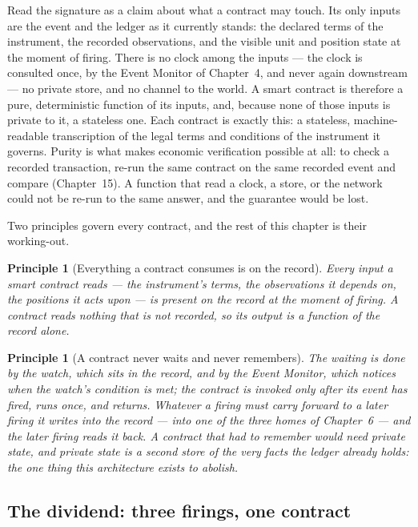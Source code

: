 \documentclass[11pt,a4paper]{article}
\newtheorem{principle}[definition]{Principle}
\begin{document}
Read the signature as a claim about what a contract may touch. Its only inputs
are the event and the ledger as it currently stands: the declared terms of the
instrument, the recorded observations, and the visible unit and position state
at the moment of firing. There is no clock among the inputs --- the clock is
consulted once, by the Event Monitor of Chapter~4, and never again downstream
--- no private store, and no channel to the world. A smart contract is
therefore a pure, deterministic function of its inputs, and, because none of
those inputs is private to it, a stateless one. Each contract is exactly this: a
stateless, machine-readable transcription of the legal terms and conditions of
the instrument it governs. Purity is what makes economic verification possible
at all: to check a recorded transaction, re-run the same contract on the same
recorded event and compare (Chapter~15). A function that read a clock, a store,
or the network could not be re-run to the same answer, and the guarantee would
be lost.

Two principles govern every contract, and the rest of this chapter is their
working-out.

\begin{principle}[Everything a contract consumes is on the record]
Every input a smart contract reads --- the instrument's terms, the observations
it depends on, the positions it acts upon --- is present on the record at the
moment of firing. A contract reads nothing that is not recorded, so its output
is a function of the record alone.
\end{principle}

\begin{principle}[A contract never waits and never remembers]
The waiting is done by the watch, which sits in the record, and by the Event
Monitor, which notices when the watch's condition is met; the contract is
invoked only after its event has fired, runs once, and returns. Whatever a
firing must carry forward to a later firing it writes into the record --- into
one of the three homes of Chapter~6 --- and the later firing reads it back. A
contract that had to remember would need private state, and private state is a
second store of the very facts the ledger already holds: the one thing this
architecture exists to abolish.
\end{principle}

\subsection{The dividend: three firings, one contract}
\end{document}
